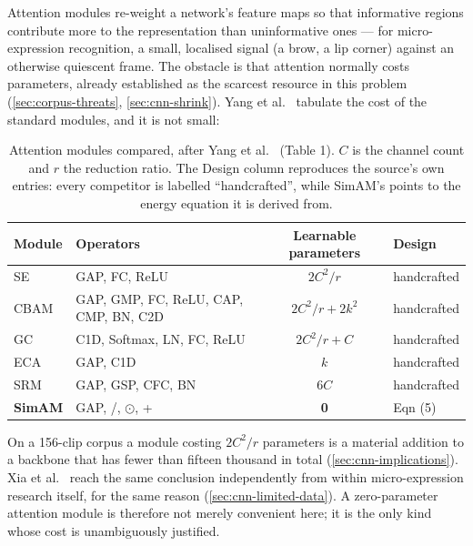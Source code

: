 Attention modules re-weight a network's feature maps so that informative regions contribute more to the representation than uninformative ones --- for micro-expression recognition, a small, localised signal (a brow, a lip corner) against an otherwise quiescent frame. The obstacle is that attention normally costs parameters, already established as the scarcest resource in this problem (\autoref{sec:corpus-threats}, \autoref{sec:cnn-shrink}). Yang et al.~\cite{yang2021} tabulate the cost of the standard modules, and it is not small:

\begin{table}[htbp]
	\centering
	\begin{tabular}{l l c l}
		\hline
		\textbf{Module} & \textbf{Operators} & \textbf{Learnable parameters} & \textbf{Design} \\
		\hline
		SE    & GAP, FC, ReLU                            & $2C^2/r$            & handcrafted \\
		CBAM  & GAP, GMP, FC, ReLU, CAP, CMP, BN, C2D    & $2C^2/r + 2k^2$     & handcrafted \\
		GC    & C1D, Softmax, LN, FC, ReLU               & $2C^2/r + C$        & handcrafted \\
		ECA   & GAP, C1D                                 & $k$                 & handcrafted \\
		SRM   & GAP, GSP, CFC, BN                        & $6C$                & handcrafted \\
		\textbf{SimAM} & GAP, /, $\odot$, +              & \textbf{0}          & Eqn (5) \\
		\hline
	\end{tabular}
	\caption[Attention modules compared]{Attention modules compared, after Yang et al.~\cite{yang2021} (Table 1). $C$ is the channel count and $r$ the reduction ratio. The Design column reproduces the source's own entries: every competitor is labelled ``handcrafted'', while SimAM's points to the energy equation it is derived from.}
	\label{tab:attention-modules}
\end{table}

On a 156-clip corpus a module costing $2C^2/r$ parameters is a material addition to a backbone that has fewer than fifteen thousand in total (\autoref{sec:cnn-implications}). Xia et al.~\cite{xia2020b} reach the same conclusion independently from within micro-expression research itself, for the same reason (\autoref{sec:cnn-limited-data}). A zero-parameter attention module is therefore not merely convenient here; it is the only kind whose cost is unambiguously justified.

